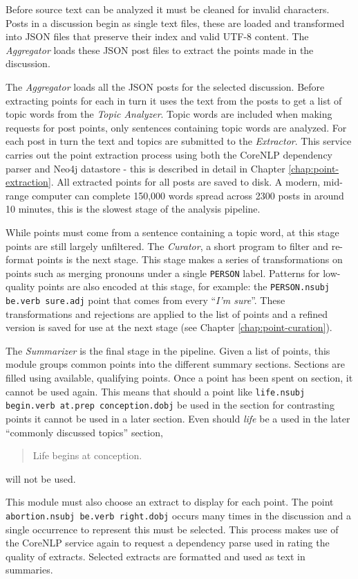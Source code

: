   Before source text can be analyzed it must be cleaned for invalid characters. Posts in a discussion begin as single text files, these are loaded and transformed into JSON files that preserve their index and valid UTF-8 content. The \textit{Aggregator} loads these JSON post files to extract the points made in the discussion.

  The \textit{Aggregator} loads all the JSON posts for the selected discussion. Before extracting points for each in turn it uses the text from the posts to get a list of topic words from the \textit{Topic Analyzer}. Topic words are included when making requests for post points, only sentences containing topic words are analyzed. For each post in turn the text and topics are submitted to the \textit{Extractor}. This service carries out the point extraction process using both the CoreNLP dependency parser and Neo4j datastore - this is described in detail in Chapter \ref{chap:point-extraction}. All extracted points for all posts are saved to disk. A modern, mid-range computer can complete 150,000 words spread across 2300 posts in around 10 minutes, this is the slowest stage of the analysis pipeline.

  While points must come from a sentence containing a topic word, at this stage points are still largely unfiltered. The \textit{Curator}, a short program to filter and re-format points is the next stage. This stage makes a series of transformations on points such as merging pronouns under a single \texttt{PERSON} label. Patterns for low-quality points are also encoded at this stage, for example: the \texttt{PERSON.nsubj be.verb sure.adj} point that comes from every ``\textit{I'm sure}''. These transformations and rejections are applied to the list of points and a refined version is saved for use at the next stage (see Chapter \ref{chap:point-curation}).

  The \textit{Summarizer} is the final stage in the pipeline. Given a list of points, this module groups common points into the different summary sections. Sections are filled using available, qualifying points. Once a point has been spent on section, it cannot be used again. This means that should a point like \texttt{life.nsubj begin.verb at.prep conception.dobj} be used in the section for contrasting points it cannot be used in a later section. Even should \textit{life} be a used in the later ``commonly discussed topics'' section, \blockquote{Life begins at conception.} will not be used.

  This module must also choose an extract to display for each point. The point \texttt{abortion.nsubj be.verb right.dobj} occurs many times in the discussion and a single occurrence to represent this must be selected. This process makes use of the CoreNLP service again to request a dependency parse used in rating the quality of extracts. Selected extracts are formatted and used as text in summaries.

